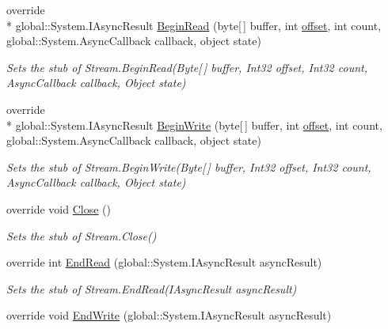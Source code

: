 \begin{DoxyCompactItemize}
override \\*
global\-::\-System.\-I\-Async\-Result \hyperlink{class_system_1_1_net_1_1_security_1_1_fakes_1_1_stub_authenticated_stream_a6c4e5c13da9e62404c443a596c2ba2a7}{Begin\-Read} (byte\mbox{[}$\,$\mbox{]} buffer, int \hyperlink{jquery-1_810_82_8js_a4a9f594d20d927164551fc7fa4751a2f}{offset}, int count, global\-::\-System.\-Async\-Callback callback, object state)
\begin{DoxyCompactList}\small\item\em Sets the stub of Stream.\-Begin\-Read(\-Byte\mbox{[}$\,$\mbox{]} buffer, Int32 offset, Int32 count, Async\-Callback callback, Object state)\end{DoxyCompactList}\item 
override \\*
global\-::\-System.\-I\-Async\-Result \hyperlink{class_system_1_1_net_1_1_security_1_1_fakes_1_1_stub_authenticated_stream_a556f87daa2f45d4cec82817f3da2368e}{Begin\-Write} (byte\mbox{[}$\,$\mbox{]} buffer, int \hyperlink{jquery-1_810_82_8js_a4a9f594d20d927164551fc7fa4751a2f}{offset}, int count, global\-::\-System.\-Async\-Callback callback, object state)
\begin{DoxyCompactList}\small\item\em Sets the stub of Stream.\-Begin\-Write(\-Byte\mbox{[}$\,$\mbox{]} buffer, Int32 offset, Int32 count, Async\-Callback callback, Object state)\end{DoxyCompactList}\item 
override void \hyperlink{class_system_1_1_net_1_1_security_1_1_fakes_1_1_stub_authenticated_stream_ae7b2bfe1f0c617a666295b24d10ef01a}{Close} ()
\begin{DoxyCompactList}\small\item\em Sets the stub of Stream.\-Close()\end{DoxyCompactList}\item 
override int \hyperlink{class_system_1_1_net_1_1_security_1_1_fakes_1_1_stub_authenticated_stream_aca24636f27229a551d140d4089d6e0db}{End\-Read} (global\-::\-System.\-I\-Async\-Result async\-Result)
\begin{DoxyCompactList}\small\item\em Sets the stub of Stream.\-End\-Read(\-I\-Async\-Result async\-Result)\end{DoxyCompactList}\item 
override void \hyperlink{class_system_1_1_net_1_1_security_1_1_fakes_1_1_stub_authenticated_stream_af9e578dc8ed37b99f11854742bd8a18f}{End\-Write} (global\-::\-System.\-I\-Async\-Result async\-Result)

\end{DoxyCompactItemize}
